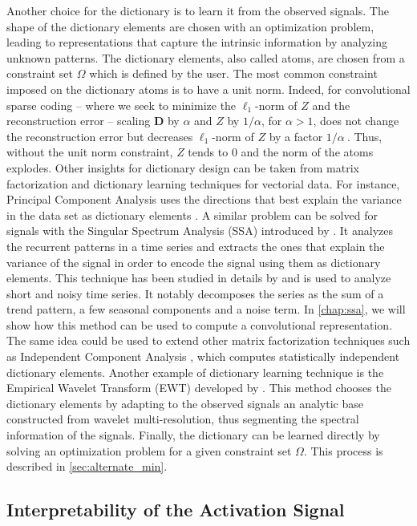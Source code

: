 \documentclass[../thesis.tex]{subfiles}
\begin{document}
	Another choice for the dictionary is to learn it from the observed signals.
	The shape of the dictionary elements are chosen with an optimization problem,
	leading to representations that capture the intrinsic information by analyzing
	unknown patterns. The dictionary elements, also called atoms, are chosen from
	a constraint set $\Omega$ which is
	defined by the user. The most common constraint imposed on the dictionary atoms
	is to have a unit norm. Indeed, for convolutional sparse coding -- where we seek
	to minimize the $\ell_1$-norm of $Z$ and the reconstruction error -- scaling
	$\pmb D$ by $\alpha$ and $Z$ by $1/\alpha$, for $\alpha > 1$, does
	not change the reconstruction error but decreases $\ell_1$-norm of $Z$ by a factor
	$1/\alpha~.$ Thus, without the unit norm constraint, $Z$ tends to 0 and the norm
	of the atoms explodes. Other insights for dictionary design can be taken from
	matrix factorization and dictionary learning techniques for vectorial data. For
	instance, Principal Component Analysis uses the directions that best explain the
	variance in the data set as dictionary elements \citep{hotelling1933analysis}.
	A similar problem can be solved for signals with the Singular Spectrum Analysis
	(SSA) introduced by \cite{Vautard1989}. It analyzes the recurrent patterns in a
	time series and extracts the ones that explain the variance of the signal in order
	to encode the signal using them as dictionary elements. This technique
	has been studied in details by \cite{Golyandina2002} and is used to analyze short
	and noisy time series. It notably decomposes the series as the sum of a trend pattern,
	a few seasonal components and a noise term. In \autoref{chap:ssa}, we will show
	how this method can be used to compute a convolutional representation. The same idea
	could be used to extend other matrix factorization techniques such as Independent
	Component Analysis \citep{Naik2011}, which computes statistically independent
	dictionary elements.	Another example of dictionary learning technique is the
	Empirical Wavelet Transform (EWT) developed by \citet{Gilles2013}. This method
	chooses the dictionary elements by adapting to the observed signals an analytic
	base constructed from wavelet multi-resolution, thus segmenting the spectral information
	of the signals. Finally, the dictionary can be learned directly by solving an
	optimization problem for a given constraint set $\Omega$. This process is described
	in \autoref{sec:alternate_min}.
	



\subsection{Interpretability of the Activation Signal}
\label{par:embeding_dict}
\end{document}
